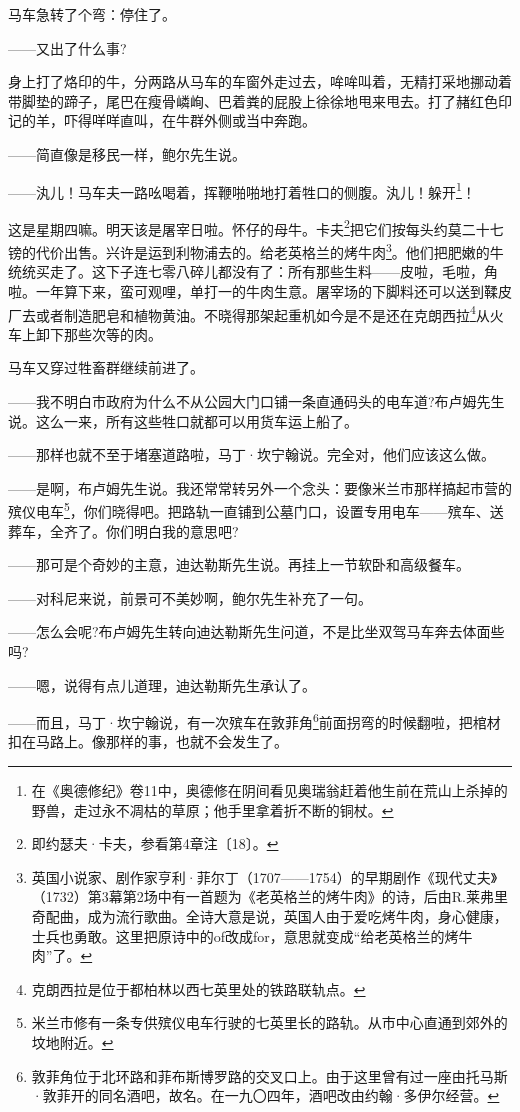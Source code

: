 \par 马车急转了个弯：停住了。
\par ——又出了什么事?
\par 身上打了烙印的牛，分两路从马车的车窗外走过去，哞哞叫着，无精打采地挪动着带脚垫的蹄子，尾巴在瘦骨嶙峋、巴着粪的屁股上徐徐地甩来甩去。打了赭红色印记的羊，吓得咩咩直叫，在牛群外侧或当中奔跑。
\par ——简直像是移民一样，鲍尔先生说。
\par ——汍儿！马车夫一路吆喝着，挥鞭啪啪地打着牲口的侧腹。汍儿！躲开\footnote{在《奥德修纪》卷11中，奥德修在阴间看见奥瑞翁赶着他生前在荒山上杀掉的野兽，走过永不凋枯的草原；他手里拿着折不断的铜杖。}！
\par 这是星期四嘛。明天该是屠宰日啦。怀仔的母牛。卡夫\footnote{即约瑟夫·卡夫，参看第4章注〔18〕。}把它们按每头约莫二十七镑的代价出售。兴许是运到利物浦去的。给老英格兰的烤牛肉\footnote{英国小说家、剧作家亨利·菲尔丁（1707——1754）的早期剧作《现代丈夫》（1732）第3幕第2场中有一首题为《老英格兰的烤牛肉》的诗，后由R.莱弗里奇配曲，成为流行歌曲。全诗大意是说，英国人由于爱吃烤牛肉，身心健康，士兵也勇敢。这里把原诗中的of改成for，意思就变成“给老英格兰的烤牛肉”了。}。他们把肥嫩的牛统统买走了。这下子连七零八碎儿都没有了：所有那些生料——皮啦，毛啦，角啦。一年算下来，蛮可观哩，单打一的牛肉生意。屠宰场的下脚料还可以送到鞣皮厂去或者制造肥皂和植物黄油。不晓得那架起重机如今是不是还在克朗西拉\footnote{克朗西拉是位于都柏林以西七英里处的铁路联轨点。}从火车上卸下那些次等的肉。
\par 马车又穿过牲畜群继续前进了。
\par ——我不明白市政府为什么不从公园大门口铺一条直通码头的电车道?布卢姆先生说。这么一来，所有这些牲口就都可以用货车运上船了。
\par ——那样也就不至于堵塞道路啦，马丁·坎宁翰说。完全对，他们应该这么做。
\par ——是啊，布卢姆先生说。我还常常转另外一个念头：要像米兰市那样搞起市营的殡仪电车\footnote{米兰市修有一条专供殡仪电车行驶的七英里长的路轨。从市中心直通到郊外的坟地附近。}，你们晓得吧。把路轨一直铺到公墓门口，设置专用电车——殡车、送葬车，全齐了。你们明白我的意思吧?
\par ——那可是个奇妙的主意，迪达勒斯先生说。再挂上一节软卧和高级餐车。
\par ——对科尼来说，前景可不美妙啊，鲍尔先生补充了一句。
\par ——怎么会呢?布卢姆先生转向迪达勒斯先生问道，不是比坐双驾马车奔去体面些吗?
\par ——嗯，说得有点儿道理，迪达勒斯先生承认了。
\par ——而且，马丁·坎宁翰说，有一次殡车在敦菲角\footnote{敦菲角位于北环路和菲布斯博罗路的交叉口上。由于这里曾有过一座由托马斯·敦菲开的同名酒吧，故名。在一九〇四年，酒吧改由约翰·多伊尔经营。}前面拐弯的时候翻啦，把棺材扣在马路上。像那样的事，也就不会发生了。
